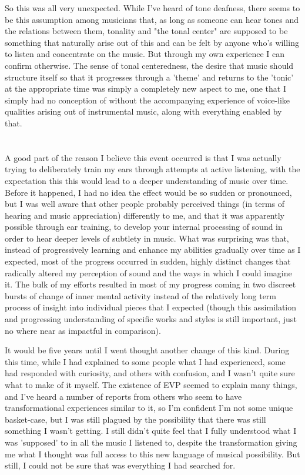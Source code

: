 \documentclass[]{article}
\begin{document}
So this was all very unexpected. While I've heard of tone deafness, there seems to be this assumption among musicians that, as long as someone can hear tones and the relations between them, tonality and "the tonal center" are supposed to be something that naturally arise out of this and can be felt by anyone who's willing to listen and concentrate on the music. But through my own experience I can confirm otherwise. The sense of tonal centeredness, the desire that music should structure itself so that it progresses through a 'theme' and returns to the 'tonic' at the appropriate time was simply a completely new aspect to me, one that I simply had no conception of without the accompanying experience of voice-like qualities arising out of instrumental music, along with everything enabled by that.


\section{}


A good part of the reason I believe this event occurred is that I was actually trying to deliberately train my ears through attempts at active listening, with the expectation this this would lead to a deeper understanding of music over time. Before it happened, I had no idea the effect would be so sudden or pronounced, but I was well aware that other people probably perceived things (in terms of hearing and music appreciation) differently to me, and that it was apparently possible through ear training, to develop your internal processing of sound in order to hear deeper levels of subtlety in music. What was surprising was that, instead of progressively learning and enhance my abilities gradually over time as I expected, most of the progress occurred in sudden, highly distinct changes that radically altered my perception of sound and the ways in which I could imagine it. The bulk of my efforts resulted in most of my progress coming in two discreet bursts of change of inner mental activity instead of the relatively long term process of insight into individual pieces that I expected (though this assimilation and progressing understanding of specific works and styles is still important, just no where near as impactful in comparison).


It would be five years until I went thought another change of this kind. During this time, while I had explained to some people what I had experienced, some had responded with curiosity, and others with confusion, and I wasn't quite sure what to make of it myself. The existence of EVP seemed to explain many things, and I've heard a number of reports from others who seem to have transformational experiences similar to it, so I'm confident I'm not some unique basket-case, but I was still plagued by the possibility that there was still something I wasn't getting. I still didn't quite feel that I fully understood what I was 'supposed' to in all the music I listened to, despite the transformation giving me what I thought was full access to this new language of musical possibility. But still, I could not be sure that was everything I had searched for.
\end{document}
